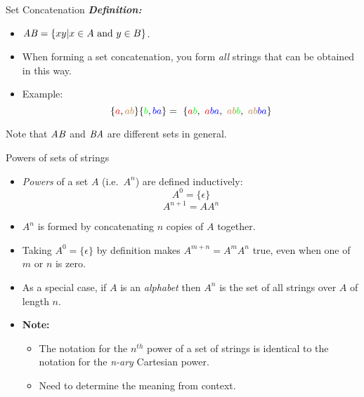 \documentclass[style=sailor,size=12pt]{powerdot}
\begin{document}
\begin{slide}[bm=,toc=]{Set Concatenation}
\emph{\textbf{Definition:}}
\begin{itemize}
   \item  $\mathit{AB} = \{xy | x \in A \text{ and } y \in B\}$. 
   \item When forming a set concatenation, you form \emph{all} strings that can be obtained in this way.
   \item Example:
   \[\{\textcolor{red}{a},\textcolor{brown}{ab}\}\{\textcolor{green}{b},\textcolor{blue}{ba}\} = \
                      \{\textcolor{red}{a}\textcolor{green}{b}, \
                        \textcolor{red}{a}\textcolor{blue}{ba}, \
                        \textcolor{brown}{ab}\textcolor{green}{b}, \
                        \textcolor{brown}{ab}\textcolor{blue}{ba}\}
   \]
\end{itemize} 
   Note that $\mathit{AB}$ and $\mathit{BA}$ are different sets in general.
\end{slide}


\begin{slide}[bm=,toc=]{Powers of sets of strings}
\begin{itemize}
\item \emph{Powers} of a set $A$ (i.e.\ $A^n$) are defined inductively:
\[
  A^0 = \{\epsilon\}
\]
\[
  A^{n+1} = AA^n
\]

\item $A^n$ is formed by concatenating $n$ copies of $A$ together. 
\item Taking $A^0 = \{\epsilon\}$ by definition makes $A^{m+n} = A^mA^n$ true, 
      even when one of $m$ or $n$ is zero. 
\item As a special case, if $A$ is an \emph{alphabet} then $A^n$ is the set of all strings
over $A$ of length $n$.
\item \textbf{Note:} 
\begin{itemize}
    \item The notation for the $n^{th}$ power of a set of strings is identical to
    the notation for the \emph{n-ary} Cartesian power.
    \item Need to determine the meaning from context.
\end{itemize}
\end{itemize}
\end{slide}
\end{document}
